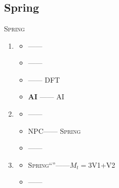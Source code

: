 \documentclass[12pt,a4paper]{article}
\theoremstyle{remark}
\newcommand{\Spring}{\textsc{Spring}}
\begin{document}
\newpage

\section{}

\subsection{Spring}

\Spring{}

\begin{enumerate}[label=(\arabic*),itemsep=3pt]
    \item \textbf{}
    \begin{itemize}[nosep]
        \item \textbf{} ——
        
        \item \textbf{} ——
        
        \item \textbf{} ——
        DFT
        \item \textbf{AI} ——
        AI
    \end{itemize}

    \item \textbf{}
    \begin{itemize}[nosep]
        \item \textbf{} ——
        
        \item \textbf{} NPC——
        \Spring{}
        \item \textbf{} ——
        
    \end{itemize}

    \item \textbf{}
    \begin{itemize}[nosep]
        \item \textbf{} 
        \Spring{}“”——$M_t=3$V1+V2
        \item \textbf{} ——
        
    \end{itemize}
\end{enumerate}

\subsection{}
\end{document}
